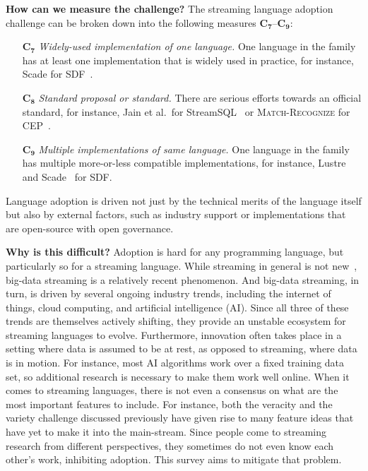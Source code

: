 \textbf{How can we measure the challenge?}
%
The streaming language  adoption challenge can be broken down
into the following measures $\mathbf{C_7}$--$\mathbf{C_9}$:

\begin{itemize}[leftmargin=6mm,itemsep=1mm]
  \item[$\mathbf{C_7}$] \emph{Widely-used implementation of one
    language.}  One language in the family has at least one
    implementation that is widely used in practice, for instance,
    Scade for SDF~\cite{scade_2017}.
  \item[$\mathbf{C_8}$] \emph{Standard proposal or standard.}  There
    are serious efforts towards an official standard, for instance,
    Jain et al.\ for StreamSQL~\cite{jain_et_al_2008} or
    \textsc{Match-Recognize} for CEP~\cite{zemke_et_al_2007}.
  \item[$\mathbf{C_9}$] \emph{Multiple implementations of same
    language.}  One language in the family has multiple more-or-less
    compatible implementations, for instance,
    Lustre~\cite{lustre_1987} and Scade~\cite{scade_2017} for SDF.
\end{itemize}

Language adoption is driven not just by the technical merits of the
language itself but also by external factors, such as industry support
or implementations that are open-source with open governance.

\textbf{Why is this difficult?}
%
Adoption is hard for any programming language, but 
particularly so for a streaming language. While streaming in general
is not new~\cite{stephens_1997}, big-data streaming is a relatively
recent phenomenon. And big-data streaming, in turn, is driven by
several ongoing industry trends, including the internet of things,
cloud computing, and artificial intelligence (AI). Since all three of these
trends are themselves actively shifting, they provide an unstable
ecosystem for streaming languages to evolve. Furthermore,
innovation often takes place in a setting where data is assumed to be
at rest, as opposed to streaming, where data is in motion. For
instance, most AI algorithms work over a fixed training data set, so
additional research is necessary to make them work well online.  When
it comes to streaming languages, there is not even a consensus on what
are the most important features to include. For instance, both the
veracity and the variety challenge discussed previously have given
rise to many feature ideas that have yet to make it into the
main-stream.  Since people come to streaming research from different
perspectives, they sometimes do not even know each other's work,
inhibiting adoption. This survey aims to mitigate that problem.
